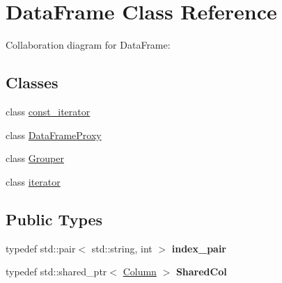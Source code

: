 \hypertarget{classDataFrame}{}\section{Data\+Frame Class Reference}
\label{classDataFrame}


Collaboration diagram for Data\+Frame\+:
\subsection*{Classes}
\begin{DoxyCompactItemize}
\item 
class \hyperlink{classDataFrame_1_1const__iterator}{const\+\_\+iterator}
\item 
class \hyperlink{classDataFrame_1_1DataFrameProxy}{Data\+Frame\+Proxy}
\item 
class \hyperlink{classDataFrame_1_1Grouper}{Grouper}
\item 
class \hyperlink{classDataFrame_1_1iterator}{iterator}
\end{DoxyCompactItemize}
\subsection*{Public Types}
\begin{DoxyCompactItemize}
\item 
\mbox{\label{classDataFrame_ad93eb4d37be97ccfb877d55492e7c466}} 
typedef std\+::pair$<$ std\+::string, int $>$ {\bfseries index\+\_\+pair}
\item 
\mbox{\label{classDataFrame_ab4b83782ba7a3ce010fae4f73480c26f}} 
typedef std\+::shared\+\_\+ptr$<$ \hyperlink{classColumn}{Column} $>$ {\bfseries Shared\+Col}
\end{DoxyCompactItemize}
